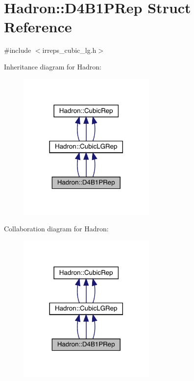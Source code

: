 \hypertarget{structHadron_1_1D4B1PRep}{}\section{Hadron\+:\+:D4\+B1\+P\+Rep Struct Reference}
\label{structHadron_1_1D4B1PRep}


{\ttfamily \#include $<$irreps\+\_\+cubic\+\_\+lg.\+h$>$}



Inheritance diagram for Hadron\+:
\nopagebreak
\begin{figure}[H]
\begin{center}
\leavevmode
\includegraphics[width=192pt]{d6/d30/structHadron_1_1D4B1PRep__inherit__graph}
\end{center}
\end{figure}


Collaboration diagram for Hadron\+:
\nopagebreak
\begin{figure}[H]
\begin{center}
\leavevmode
\includegraphics[width=192pt]{d7/d2e/structHadron_1_1D4B1PRep__coll__graph}
\end{center}
\end{figure}

